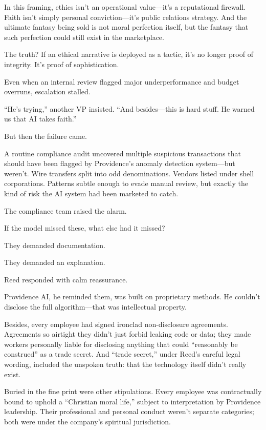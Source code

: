 \begin{tcolorbox}[colback=blue!5!white, colframe=blue!50!black, breakable, title={Psychological Sidebar: Law 32 --- Play to people's fantasies}]
In this framing, ethics isn’t an operational value—it’s a reputational firewall. Faith isn’t simply personal conviction—it’s public relations strategy. And the ultimate fantasy being sold is not moral perfection itself, but the fantasy that such perfection could still exist in the marketplace.

\medskip

The truth? If an ethical narrative is deployed as a tactic, it’s no longer proof of integrity. It’s proof of sophistication.

\end{tcolorbox}

\medskip

Even when an internal review flagged major underperformance and budget overruns, escalation stalled.

“He’s trying,” another VP insisted.  
“And besides—this is hard stuff. He warned us that AI takes faith.”

But then the failure came.

A routine compliance audit uncovered multiple suspicious transactions that should have been flagged by Providence’s anomaly detection system—but weren’t. Wire transfers split into odd denominations. Vendors listed under shell corporations. Patterns subtle enough to evade manual review, but exactly the kind of risk the AI\texttrademark{} system had been marketed to catch.

The compliance team raised the alarm.

If the model missed these, what else had it missed?

They demanded documentation.

They demanded an explanation.

Reed responded with calm reassurance.

Providence AI\texttrademark{}, he reminded them, was built on proprietary methods.  
He couldn’t disclose the full algorithm—that was intellectual property.

Besides, every employee had signed ironclad non-disclosure agreements. Agreements so airtight they didn’t just forbid leaking code or data; they made workers personally liable for disclosing anything that could “reasonably be construed” as a trade secret. And “trade secret,” under Reed’s careful legal wording, included the unspoken truth: that the technology itself didn’t really exist.

Buried in the fine print were other stipulations.  
Every employee was contractually bound to uphold a “Christian moral life,” subject to interpretation by Providence leadership. Their professional and personal conduct weren’t separate categories; both were under the company’s spiritual jurisdiction.

